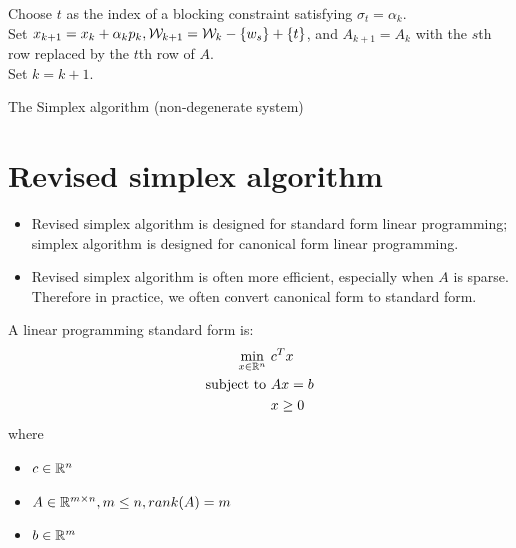 \begin{refsection}
\begin{algorithm}[H]
{		Choose $t$ as the index of a blocking constraint satisfying $\sigma_t = \alpha_k$.\\
		
		Set $x_{k+1} = x_k +\alpha_k p_k, \mathcal{W}_{k+1} = \mathcal{W}_k - \{w_s\} + \{t\}$, and $A_{k+1} = A_{k}$ with the $s$th row replaced by the $t$th row of $A$.\\
		
		Set $k = k+1$.
		
	}
	\caption{The Simplex algorithm (non-degenerate system)}
\end{algorithm}

\begin{lemma}
	
\end{lemma}




\section{Revised simplex algorithm}

\begin{remark}\hfill
\begin{itemize}
	\item Revised simplex algorithm is designed for standard form linear programming; simplex algorithm is designed for canonical form linear programming.
	\item Revised simplex algorithm is often more efficient, especially when $A$ is sparse. Therefore in practice, we often convert canonical form to standard form.
\end{itemize}	
\end{remark}

\begin{definition}
	\cite[4]{bertsimas1997introduction}\cite[lec 6]{Robinson2015nonlinear2} A linear programming standard form is:
	\begin{align*}
	\min_{x\in \mathbb{R}^n} ~ &c^Tx\\
	\text{subject to} ~ & Ax=b\\
	& x\geq 0
	\end{align*}
	where 
	\begin{itemize}
		\item $c\in \mathbb{R}^n$
		\item $A\in \mathbb{R}^{m\times n}, m\leq n, rank(A) = m$
		\item $b\in \mathbb{R}^m$ 
	\end{itemize}
\end{definition}



\end{refsection}
